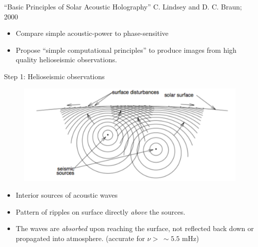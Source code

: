 \documentclass{beamer}
\begin{document}
\begin{frame}{``Basic Principles of Solar Acoustic Holography''}
    {C. Lindsey and D. C. Braun; 2000}
    \begin{itemize}
        \item Compare simple acoustic-power to phase-sensitive
        \item Propose ``simple computational principles'' to produce images
            from high quality helioseismic observations.
    \end{itemize}
\end{frame}

\begin{frame}{Step 1: Helioseismic observations}
    \begin{figure}
        \includegraphics[width=\textwidth]{fig_1.pdf}
    \end{figure}
    \begin{itemize}
        \item Interior sources of acoustic waves
        \item Pattern of ripples on surface
            directly \emph{above} the sources.
        \item The waves are \emph{absorbed} upon reaching the surface,
            not reflected back down or propagated into atmosphere.
            (accurate for $\nu >\ \sim 5.5$ mHz)
    \end{itemize}
\end{frame}
\end{document}
